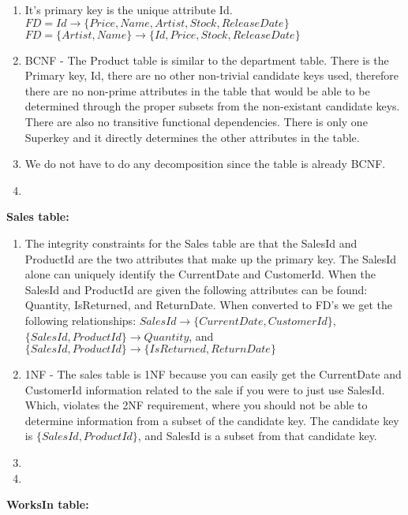 \documentclass{article}
\begin{document}
  \begin{enumerate}[label=\roman*]
  	\item It's primary key is the unique attribute Id. \newline
    $FD = Id \rightarrow \{Price, Name, Artist, Stock, ReleaseDate\}$\newline
    $FD = \{Artist, Name\} \rightarrow \{Id, Price, Stock, ReleaseDate\}$
  	\item BCNF - The Product table is similar to the department table. There is the Primary key, Id, there are no other non-trivial candidate keys used, therefore there are no non-prime attributes in the table that would be able to be determined through the proper subsets from the non-existant candidate keys. There are also no transitive functional dependencies. There is only one Superkey and it directly determines the other attributes in the table.
  	\item We do not have to do any decomposition since the table is already BCNF.
  	\item
  \end{enumerate}
  \par\textbf{Sales table:}
  \begin{enumerate}[label=\roman*]
  	\item The integrity constraints for the Sales table are that the SalesId and ProductId are the two attributes that make up the primary key. The SalesId alone can uniquely identify the CurrentDate and CustomerId. When the SalesId and ProductId are given
    the following attributes can be found: Quantity, IsReturned, and ReturnDate. When converted to FD's we get the following
    relationships: $SalesId\rightarrow\{CurrentDate,CustomerId\}$, $\{SalesId,ProductId\}\rightarrow Quantity$, and 
    $\{SalesId,ProductId\}\rightarrow\{IsReturned,ReturnDate\}$
  	\item 1NF - The sales table is 1NF because you can easily get the CurrentDate and CustomerId information related to the sale if you were to just use SalesId. Which, violates the 2NF requirement, where you should not be able to determine information from a subset of the candidate key. The candidate key is $\{SalesId,ProductId\}$, and SalesId is a subset from that candidate key.
  	\item
  	\item
  \end{enumerate}
  \par\textbf{WorksIn table:}
\end{document}
